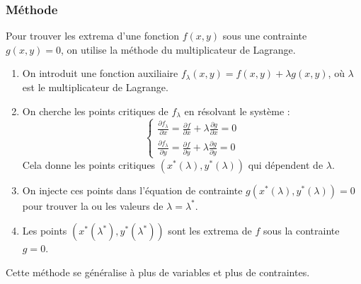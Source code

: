 \documentclass[french]{yLectureNote}
\begin{document}
\subsubsection{Méthode}
Pour trouver les extrema d'une fonction $f(x,y)$ sous une contrainte $g(x,y) = 0$, on utilise la méthode du multiplicateur de Lagrange.
\begin{enumerate}
    \item On introduit une fonction auxiliaire $f_{\lambda}(x, y) = f(x, y) + \lambda g(x, y)$, où $\lambda$ est le multiplicateur de Lagrange.
    \item On cherche les points critiques de $f_{\lambda}$ en résolvant le système :
    \[ \begin{cases}
    \frac{\partial f_{\lambda}}{\partial x} = \frac{\partial f}{\partial x} + \lambda \frac{\partial g}{\partial x} = 0 \\
    \frac{\partial f_{\lambda}}{\partial y} = \frac{\partial f}{\partial y} + \lambda \frac{\partial g}{\partial y} = 0
    \end{cases} \]
    Cela donne les points critiques $(x^*(\lambda), y^*(\lambda))$ qui dépendent de $\lambda$.
    \item On injecte ces points dans l'équation de contrainte $g(x^*(\lambda), y^*(\lambda)) = 0$ pour trouver la ou les valeurs de $\lambda = \lambda^*$.
    \item Les points $(x^*(\lambda^*), y^*(\lambda^*))$ sont les extrema de $f$ sous la contrainte $g=0$.
\end{enumerate}
Cette méthode se généralise à plus de variables et plus de contraintes.
\end{document}
